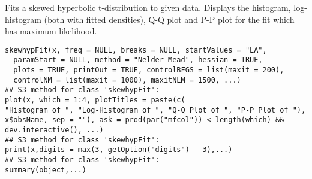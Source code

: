 \documentclass{book}
\begin{document}
\begin{Description}\relax
Fits a skewed hyperbolic t-distribution to given data.
Displays the histogram, log-histogram (both with fitted densities),
Q-Q plot and P-P plot for the fit which has maximum likelihood.
\end{Description}
\begin{Usage}
\begin{verbatim}
skewhypFit(x, freq = NULL, breaks = NULL, startValues = "LA",
  paramStart = NULL, method = "Nelder-Mead", hessian = TRUE,
  plots = TRUE, printOut = TRUE, controlBFGS = list(maxit = 200),
  controlNM = list(maxit = 1000), maxitNLM = 1500, ...)
## S3 method for class 'skewhypFit':
plot(x, which = 1:4, plotTitles = paste(c(
"Histogram of ", "Log-Histogram of ", "Q-Q Plot of ", "P-P Plot of "),
x$obsName, sep = ""), ask = prod(par("mfcol")) < length(which) &&
dev.interactive(), ...)
## S3 method for class 'skewhypFit':
print(x,digits = max(3, getOption("digits") - 3),...)
## S3 method for class 'skewhypFit':
summary(object,...)
\end{verbatim}
\end{Usage}
\end{document}
